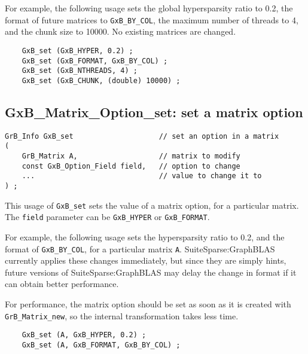 \documentclass[12pt]{article}
\begin{document}
For example, the following usage sets the global hypersparsity ratio to 0.2,
the format of future matrices to \verb'GxB_BY_COL', the maximum number
of threads to 4, and the chunk size to 10000.
No existing matrices are changed.

{\footnotesize
\begin{verbatim}
    GxB_set (GxB_HYPER, 0.2) ;
    GxB_set (GxB_FORMAT, GxB_BY_COL) ;
    GxB_set (GxB_NTHREADS, 4) ;
    GxB_set (GxB_CHUNK, (double) 10000) ;
\end{verbatim} }

\subsection{{\sf GxB\_Matrix\_Option\_set:} set a matrix option}

\begin{mdframed}[userdefinedwidth=6in]
{\footnotesize
\begin{verbatim}
GrB_Info GxB_set                    // set an option in a matrix
(
    GrB_Matrix A,                   // matrix to modify
    const GxB_Option_Field field,   // option to change
    ...                             // value to change it to
) ;
\end{verbatim} } \end{mdframed}

This usage of \verb'GxB_set' sets the value of a matrix option, for a
particular matrix.
The \verb'field' parameter can be \verb'GxB_HYPER' or \verb'GxB_FORMAT'.

For example, the following usage sets the hypersparsity
ratio to 0.2, and the format of \verb'GxB_BY_COL', for a particular matrix
\verb'A'.  SuiteSparse:GraphBLAS currently applies these changes immediately,
but since they are simply hints, future versions of SuiteSparse:GraphBLAS may
delay the change in format if it can obtain better performance.

For performance, the matrix option should be set as soon as it is created with
\verb'GrB_Matrix_new', so the internal transformation takes less time.

{\footnotesize
\begin{verbatim}
    GxB_set (A, GxB_HYPER, 0.2) ;
    GxB_set (A, GxB_FORMAT, GxB_BY_COL) ;
\end{verbatim} }

\newpage
\end{document}

